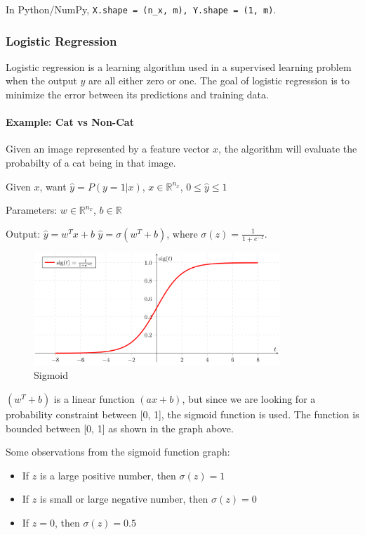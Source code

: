 \documentclass[UTF8]{article}
\newcommand{\Set}[1]{\mathbb{#1}}                   %
\begin{document}
In Python/NumPy, \texttt{X.shape = (n_x, m), Y.shape = (1, m)}.

\subsubsection{Logistic Regression}
Logistic regression is a learning algorithm used in a supervised learning problem when the output
$y$ are all either zero or one. The goal of logistic regression is to minimize the error between
its predictions and training data.

\paragraph{Example: Cat vs Non-Cat}
Given an image represented by a feature vector $x$, the algorithm will evaluate the probabilty of a
cat being in that image.

Given $x$, want $\hat{y} = P(y=1|x)$, $x \in \Set{R}^{n_x}$, $0 \leq \hat{y} \leq 1$

Parameters: $w \in \Set{R}^{n_x}$, $b \in \Set{R}$

Output: \sout{$\hat{y} = w^T x + b$} \quad $\hat{y} = \sigma (w^T + b)$, where
$\sigma(z) = \frac{1}{1+e^{-z}}$.
\begin{figure}[ht]
    \centering
    \includegraphics[width=25em]{figures/1-sigmoid}
    \caption{Sigmoid}
\end{figure}

$(w^T + b)$ is a linear function $(ax + b)$, but since we are looking for a probability constraint
between [0, 1], the sigmoid function is used. The function is bounded between [0, 1] as shown in
the graph above.

Some observations from the sigmoid function graph:
\begin{itemize}
    \item If $z$ is a large positive number, then $\sigma(z) = 1$
    \item If $z$ is small or large negative number, then $\sigma(z) = 0$
    \item If $z = 0$, then $\sigma(z) = 0.5$
\end{itemize}
\end{document}
